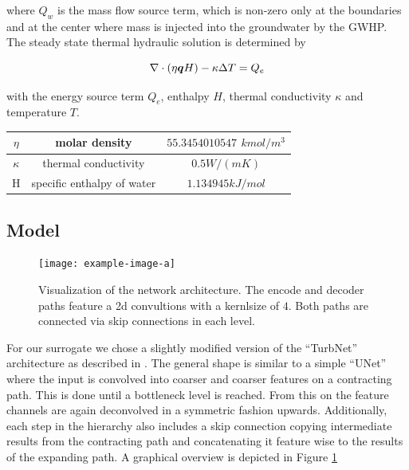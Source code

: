 \documentclass{article} %
\begin{document}
where $Q_w$ is the mass flow source term, which is non-zero only at the boundaries and at the center where mass is injected into the groundwater by the GWHP. The steady state thermal hydraulic solution is determined by

\begin{equation}
   \label{eq:energy}
   \nabla \cdot \left(\eta {\bm{q}} H\right) - \kappa \Delta T = Q_e
\end{equation}

with the energy source term $Q_e$, enthalpy $H$, thermal conductivity $\kappa$ and temperature $T$. 

\begin{tabular}{| c | c | c |}
   \hline
   $\eta$   & molar density        & $55.3454010547$ $kmol/m^3$ \\
   \hline
   $\kappa$ & thermal conductivity & $0.5 W/(mK)$                   \\
   \hline
   H        & specific enthalpy of water             & $1.134945 kJ/mol$                  \\
   \hline
\end{tabular}




\subsection*{Model}
\begin{figure}[htb]
   \centering
   \texttt{[image: example-image-a]}
   \caption{Visualization of the network architecture. The encode and decoder paths feature a 2d convultions with a kernlsize of $4$. Both paths are connected via skip connections in each level.}
   \label{fig:arch}
\end{figure}

For our surrogate we chose a slightly modified version of the ``TurbNet'' architecture as described in \cite{turbnet}.
The general shape is similar to a simple ``UNet'' \cite{unet} where the input is convolved into coarser and coarser features on a contracting path.
This is done until a bottleneck level is reached.
From this on the feature channels are again deconvolved in a symmetric fashion upwards.
Additionally, each step in the hierarchy also includes a skip connection copying intermediate results from the contracting path and concatenating it feature wise to the results of the expanding path.
A graphical overview is depicted in Figure \ref{fig:arch}
\end{document}
